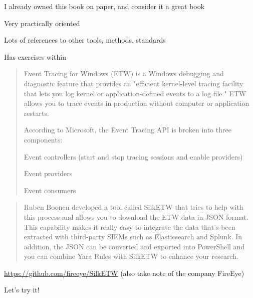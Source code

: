 \documentclass[Screen16to9,17pt]{foils}
\begin{document}
\begin{list2}
\item I already owned this book on paper, and consider it a great book
\item Very practically oriented
\item Lots of references to other tools, methods, standards
\item Has exercises within
\end{list2}



\begin{quote}
Event Tracing for Windows (ETW) is a Windows debugging and diagnostic feature
that provides an "efficient kernel-level tracing facility that lets you log kernel or
application-defined events to a log file." ETW allows you to trace events in production
without computer or application restarts.

According to Microsoft, the Event Tracing API is broken into three components:
\begin{list2}
\item Event controllers (start and stop tracing sessions and enable providers)
\item Event providers
\item Event consumers
\end{list2}
\end{quote}


\begin{quote}
Ruben Boonen developed a tool called SilkETW that tries to help with this process and
allows you to download the ETW data in JSON format. This capability makes it really easy
to integrate the data that's been extracted with third-party SIEMs such as Elasticsearch
and Splunk. In addition, the JSON can be converted and exported into PowerShell and
you can combine Yara Rules with SilkETW to enhance your research.
\end{quote}

\begin{list2}
\item \url{https://github.com/fireeye/SilkETW} (also take note of the company FireEye)
\item Let's try it!
\end{list2}

\end{document}
